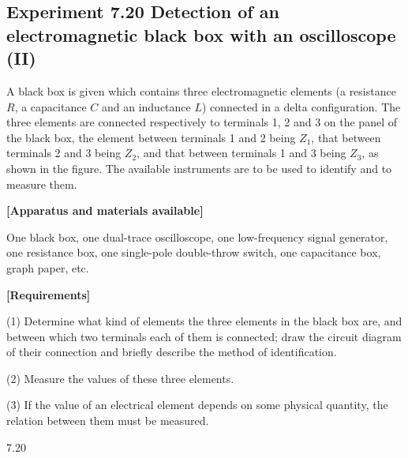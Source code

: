 \subsection*{Experiment 7.20 \quad Detection of an electromagnetic black box with an oscilloscope (II)}

A black box is given which contains three electromagnetic elements (a resistance $R$, a capacitance $C$ and an inductance $L$) connected in a delta configuration. The three elements are connected respectively to terminals 1, 2 and 3 on the panel of the black box, the element between terminals 1 and 2 being $Z_1$, that between terminals 2 and 3 being $Z_2$, and that between terminals 1 and 3 being $Z_3$, as shown in the figure. The available instruments are to be used to identify and to measure them.

\textbf{[Apparatus and materials available]}

One black box, one dual-trace oscilloscope, one low-frequency signal generator, one resistance box, one single-pole double-throw switch, one capacitance box, graph paper, etc.

\textbf{[Requirements]}

(1) Determine what kind of elements the three elements in the black box are, and between which two terminals each of them is connected; draw the circuit diagram of their connection and briefly describe the method of identification.

(2) Measure the values of these three elements.

(3) If the value of an electrical element depends on some physical quantity, the relation between them must be measured.

\begin{figbox}{7.20}
\end{figbox}

